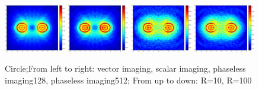 \documentclass[12pt]{iopart}
\begin{document}
\begin{figure}
	\centering
	\includegraphics[width=0.24\textwidth]{./graphic_phase/bi_circle_r_10_k_4_vector.eps}
	\includegraphics[width=0.24\textwidth]{./graphic_phase/bi_circle_r_10_k_4_scalar.eps}
	\includegraphics[width=0.24\textwidth]{./graphic_phase/bi_circle_r_10_k_4_phaseless_n_128_bias_100.eps}
	\includegraphics[width=0.24\textwidth]{./graphic_phase/bi_circle_r_10_k_4_phaseless_n_512_bias_100.eps}
	
	\caption{Circle;From left to right: vector imaging, scalar imaging, phaseless imaging128, phaseless imaging512; From up to down: R=10, R=100 }\label{figure_bicircle_phaless}
\end{figure}
\end{document}
